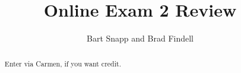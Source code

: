 \documentclass[handout,space,nooutcomes]{xourse}
\title{Online Exam 2 Review}
\author{Bart Snapp and Brad Findell}
\begin{document}
\begin{abstract}
Enter via Carmen, if you want credit.  
\end{abstract}
\maketitle

{}
\end{document}
